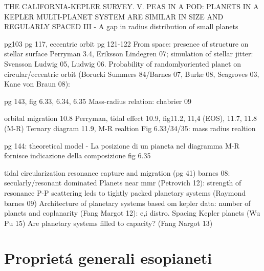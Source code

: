 \begin{workout}
THE CALIFORNIA-KEPLER SURVEY. V. PEAS IN A POD: PLANETS IN A KEPLER MULTI-PLANET SYSTEM ARE SIMILAR IN SIZE AND REGULARLY SPACED
						 III - A gap in radius distribution of small planets
\end{workout}

\begin{workout}
pg103
pg 117, eccentric orbit pg 121-122
From space: presence of structure on stellar surface Perryman 3.4, Eriksson Lindegren 07; simulation of stellar jitter: Svensson Ludwig 05, Ludwig 06.
Probability of randomlyoriented planet on circular/eccentric orbit (Borucki Summers 84/Barnes 07, Burke 08,  Seagroves 03, Kane von Braun 08):
\end{workout}

\begin{workout}
pg 143, fig 6.33, 6.34, 6.35
Mass-radius relation: chabrier 09
\end{workout}

\begin{workout}[M-R diagram]
orbital migration 10.8 Perryman, tidal effect 10.9, 
fig11.2, 11,4 (EOS), 11.7, 11.8 (M-R)
Ternary diagram 11.9, M-R realtion
Fig 6.33/34/35: mass radius realtion

pg 144: theoretical model - La posizione di un pianeta nel diagramma M-R fornisce indicazione della composizione
fig 6.35
\end{workout}

\begin{workout}
\end{workout}

\begin{workout}
tidal circularization
resonance capture and migration (pg 41)
barnes 08: secularly/resonant dominated
Planets near mmr (Petrovich 12): strength of resonance
P-P scattering leds to tightly packed planetary systems (Raymond barnes 09)
Architecture of planetary systems based om kepler data: number of planets and coplanarity (Fang Margot 12): e,i distro.
Spacing Kepler planets (Wu Pu 15)
Are planetary systems filled to capacity? (Fang Nargot 13)
\end{workout}

\section{Propriet\'a generali esopianeti}

